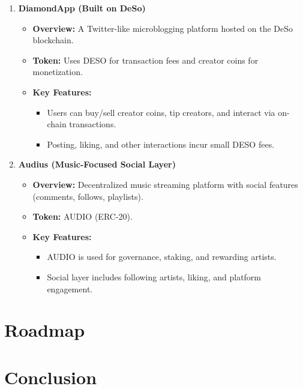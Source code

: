 \documentclass{article}
\begin{document}
\begin{itemize}
\begin{enumerate}
        \item \textbf{DiamondApp (Built on DeSo)}
          \begin{itemize}
            \item \textbf{Overview:} A Twitter-like microblogging platform hosted on the DeSo blockchain.
            \item \textbf{Token:} Uses DESO for transaction fees and creator coins for monetization.
            \item \textbf{Key Features:}
              \begin{itemize}
                \item Users can buy/sell creator coins, tip creators, and interact via on-chain transactions.
                \item Posting, liking, and other interactions incur small DESO fees.
              \end{itemize}
          \end{itemize}

        \item \textbf{Audius (Music-Focused Social Layer)}
          \begin{itemize}
            \item \textbf{Overview:} Decentralized music streaming platform with social features (comments, follows, playlists).
            \item \textbf{Token:} AUDIO (ERC-20).
            \item \textbf{Key Features:}
              \begin{itemize}
                \item AUDIO is used for governance, staking, and rewarding artists.
                \item Social layer includes following artists, liking, and platform engagement.
              \end{itemize}
          \end{itemize}
    \end{enumerate}
\end{itemize}

\section{Roadmap}

\section{Conclusion}
\end{document}
